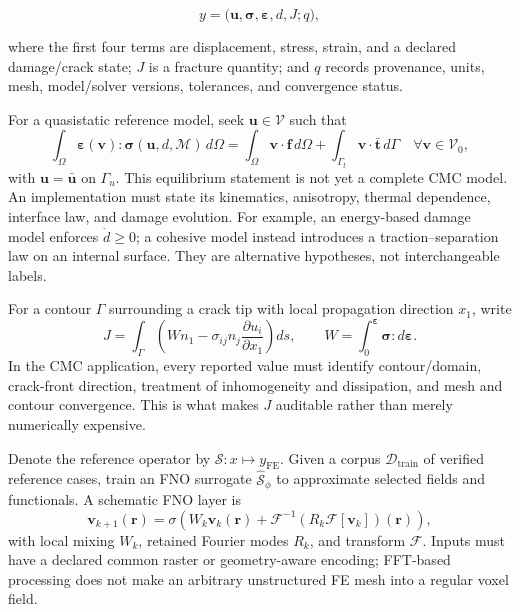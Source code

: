 \documentclass[11pt]{article}
\begin{document}
\begin{equation}
 y=\bigl(\bm{u},\bm{\sigma},\bm{\varepsilon},d,J;q\bigr),
\end{equation}

where the first four terms are displacement, stress, strain, and a declared
damage/crack state; $J$ is a fracture quantity; and $q$ records provenance,
units, mesh, model/solver versions, tolerances, and convergence status.

For a quasistatic reference model, seek $\bm{u}\in\mathcal{V}$ such that
\begin{equation}
 \int_{\Omega}\bm{\varepsilon}(\bm{v}):
 \bm{\sigma}(\bm{u},d,\mathcal{M})\,d\Omega
 =\int_{\Omega}\bm{v}\cdot\bm{f}\,d\Omega+
 \int_{\Gamma_t}\bm{v}\cdot\bar{\bm{t}}\,d\Gamma
 \quad\forall\bm{v}\in\mathcal{V}_0,
 \label{eq:equilibrium}
\end{equation}
with $\bm{u}=\bar{\bm{u}}$ on $\Gamma_u$.  This equilibrium statement is not
yet a complete CMC model.  An implementation must state its kinematics,
anisotropy, thermal dependence, interface law, and damage evolution.  For
example, an energy-based damage model enforces $\dot d\geq0$; a cohesive model
instead introduces a traction--separation law on an internal surface.  They are
alternative hypotheses, not interchangeable labels.

For a contour $\Gamma$ surrounding a crack tip with local propagation direction
$x_1$, write
\begin{equation}
 J=\int_{\Gamma}\left(Wn_1-\sigma_{ij}n_j
 \frac{\partial u_i}{\partial x_1}\right)ds,
 \qquad W=\int_0^{\bm{\varepsilon}}\bm{\sigma}:d\bm{\varepsilon}.
 \label{eq:j}
\end{equation}
In the CMC application, every reported value must identify contour/domain,
crack-front direction, treatment of inhomogeneity and dissipation, and mesh and
contour convergence.  This is what makes $J$ auditable rather than merely
numerically expensive.

Denote the reference operator by $\mathcal{S}:x\mapsto y_{\mathrm{FE}}$.  Given
a corpus $\mathcal{D}_{\mathrm{train}}$ of verified reference cases, train an
FNO surrogate $\widehat{\mathcal{S}}_\phi$ to approximate selected fields and
functionals.  A schematic FNO layer is
\begin{equation}
 \bm{v}_{k+1}(\bm{r})=\sigma\!\left(W_k\bm{v}_k(\bm{r})+
 \mathcal{F}^{-1}\!\left(R_k\mathcal{F}[\bm{v}_k]\right)(\bm{r})\right),
\end{equation}
with local mixing $W_k$, retained Fourier modes $R_k$, and transform
$\mathcal{F}$.  Inputs must have a declared common raster or geometry-aware
encoding; FFT-based processing does not make an arbitrary unstructured FE mesh
into a regular voxel field.
\end{document}
